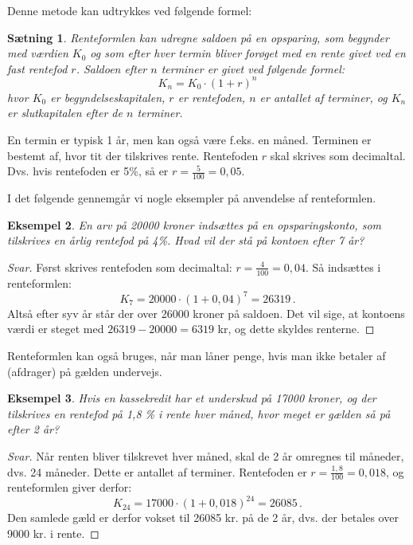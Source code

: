 \documentclass[12pt,oneside,a4paper]{article}
\newtheorem{thm}{Sætning}[section]
\newtheorem{eks}[thm]{Eksempel}
\begin{document}
Denne metode kan udtrykkes ved følgende formel:
\begin{tcolorbox}
\begin{thm}
{\em Renteformlen} kan udregne saldoen på en opsparing, som begynder med
værdien $K_0$ og som efter hver {\em termin} bliver forøget med en rente
givet ved en fast rentefod $r$. Saldoen efter $n$ terminer er givet ved
følgende formel:
$$
K_n = K_0 \cdot (1+r)^n
$$
hvor $K_0$ er {\em begyndelseskapitalen}, $r$ er rentefoden, $n$ er antallet af
terminer, og $K_n$ er {\em slutkapitalen} efter de $n$ terminer.
\end{thm}
\end{tcolorbox}
En termin er typisk 1 år, men kan også være f.eks. en måned. Terminen er
bestemt af, hvor tit der tilskrives rente. Rentefoden $r$ skal skrives som
decimaltal.  Dvs. hvis rentefoden er 5\%, så er $r=\frac{5}{100}=0,05$.

I det følgende gennemgår vi nogle eksempler på anvendelse af renteformlen.
\begin{tcolorbox}
\begin{eks}
En arv på 20000 kroner indsættes på en opsparingskonto, som tilskrives en
årlig rentefod på 4\%. Hvad vil der stå på kontoen efter 7 år?
\end{eks}
\begin{proof}[Svar]
Først skrives rentefoden som decimaltal: $r=\frac{4}{100} = 0,04$. Så
indsættes i renteformlen:
\[ 
K_7 = 20000 \cdot (1 + 0,04)^7 = 26319\,.
\]
Altså efter syv år står der over 26000 kroner på saldoen.  Det vil sige, at
kontoens værdi er steget med $26319 - 20000 = 6319$ kr, og dette skyldes
renterne.
\end{proof}
\end{tcolorbox}

Renteformlen kan også bruges, når man låner penge, hvis man ikke betaler af
(afdrager) på gælden undervejs.
\begin{tcolorbox}
\begin{eks}
Hvis en kassekredit har et underskud på 17000 kroner, og der tilskrives en
rentefod på 1,8 \% i rente hver måned, hvor meget er gælden så på efter 2
år?
\end{eks}
\begin{proof}[Svar]
Når renten bliver tilskrevet hver måned, skal de 2 år omregnes til
måneder, dvs. 24 måneder. Dette er antallet af terminer. Rentefoden er $r =
\frac{1,8}{100} = 0,018$, og renteformlen giver derfor:
\[
K_{24} = 17000 \cdot (1 + 0,018)^{24} = 26085 \,.
\]
Den samlede gæld er derfor vokset til 26085 kr. på de 2 år, dvs.  der betales
over 9000 kr. i rente.
\end{proof}
\end{tcolorbox}
\end{document}
